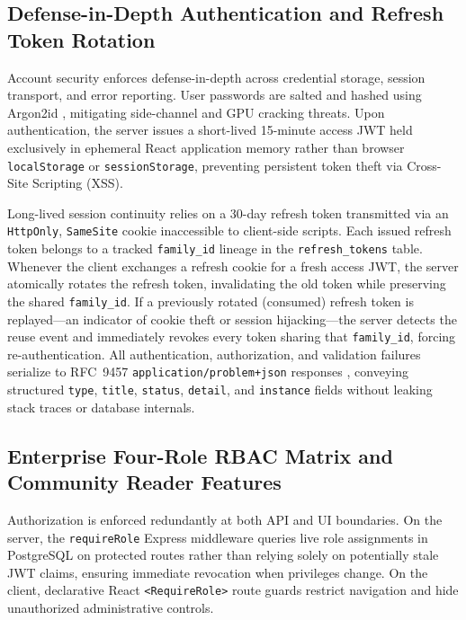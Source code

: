 \documentclass[conference]{IEEEtran}
\begin{document}
\subsection{Defense-in-Depth Authentication and Refresh Token Rotation}
Account security enforces defense-in-depth across credential storage, session transport, and error reporting. User passwords are salted and hashed using Argon2id \cite{b9}, mitigating side-channel and GPU cracking threats. Upon authentication, the server issues a short-lived 15-minute access JWT held exclusively in ephemeral React application memory rather than browser \texttt{localStorage} or \texttt{sessionStorage}, preventing persistent token theft via Cross-Site Scripting (XSS).

Long-lived session continuity relies on a 30-day refresh token transmitted via an \texttt{HttpOnly}, \texttt{SameSite} cookie inaccessible to client-side scripts. Each issued refresh token belongs to a tracked \texttt{family\_id} lineage in the \texttt{refresh\_tokens} table. Whenever the client exchanges a refresh cookie for a fresh access JWT, the server atomically rotates the refresh token, invalidating the old token while preserving the shared \texttt{family\_id}. If a previously rotated (consumed) refresh token is replayed—an indicator of cookie theft or session hijacking—the server detects the reuse event and immediately revokes every token sharing that \texttt{family\_id}, forcing re-authentication. All authentication, authorization, and validation failures serialize to RFC~9457 \texttt{application/problem+json} responses \cite{b8}, conveying structured \texttt{type}, \texttt{title}, \texttt{status}, \texttt{detail}, and \texttt{instance} fields without leaking stack traces or database internals.

\subsection{Enterprise Four-Role RBAC Matrix and Community Reader Features}
Authorization is enforced redundantly at both API and UI boundaries. On the server, the \texttt{requireRole} Express middleware queries live role assignments in PostgreSQL on protected routes rather than relying solely on potentially stale JWT claims, ensuring immediate revocation when privileges change. On the client, declarative React \texttt{<RequireRole>} route guards restrict navigation and hide unauthorized administrative controls.
\end{document}
